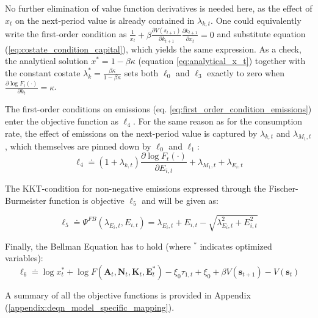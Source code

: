 No further elimination of value function derivatives is needed here, as the effect of \(x_t\) on the next-period value is already contained in \(\lambda_{k,t}\). One could equivalently write the first-order condition as \(\frac{1}{x_t} + \beta \frac{\partial V(s_{t+1})}{\partial k_{t+1}}\frac{\partial k_{t+1}}{\partial x_t} = 0\) and substitute equation (\ref{eq:costate_condition_capital}), which yields the same expression. As a check, the analytical solution \(x^* = 1 - \beta\kappa\) (equation \ref{eq:analytical_x_t}) together with the constant costate \(\lambda_k^* = \frac{\beta\kappa}{1-\beta\kappa}\) sets both \(\ell_0\) and \(\ell_3\) exactly to zero when \(\frac{\partial \log F_t(\cdot)}{\partial k_t} = \kappa\).

The first-order conditions on emissions (eq. \ref{eq:first_order_condition_emissions}) enter the objective function as \(\ell_4\). For the same reason as for the consumption rate, the effect of emissions on the next-period value is captured by \(\lambda_{k,t}\) and \(\lambda_{M_1,t}\), which themselves are pinned down by \(\ell_0\) and \(\ell_1\):
\begin{equation}
    \ell_4 \doteq (1 + \lambda_{k,t}) \frac{\partial \log F_t(\cdot)}{\partial E_{i,t}}
        + \lambda_{M_1,t}
        + \lambda_{E_i,t}
\label{eq:general_objective_4}
\end{equation}

The KKT-condition for non-negative emissions expressed through the Fischer-Burmeister function is objective \(\ell_5\) and will be given as:

\begin{equation}
    \ell_5 \doteq \Psi^{FB}(\lambda_{E_i,t},E_{i,t}) = \lambda_{E_i,t}+E_{i,t}-
        \sqrt{\lambda_{E_i,t}^2+E_{i,t}^2}
\label{eq:general_objective_5}
\end{equation}

Finally, the Bellman Equation has to hold (where \(^*\) indicates optimized variables): 
\begin{equation}
    \ell_6 \doteq
        \log x_t^* + \log F(\bm{A}_t,\bm{N}_t,\bm{K}_t,\bm{E}_t^*) - \xi_0\tau_{1,t} + \xi_0
        + \beta V(\bm{s}_{t+1})
        - V(\bm{s}_t)
\label{eq:general_objective_6}
\end{equation}

A summary of all the objective functions is provided in Appendix (\ref{appendix:deqn_model_specific_mapping}).